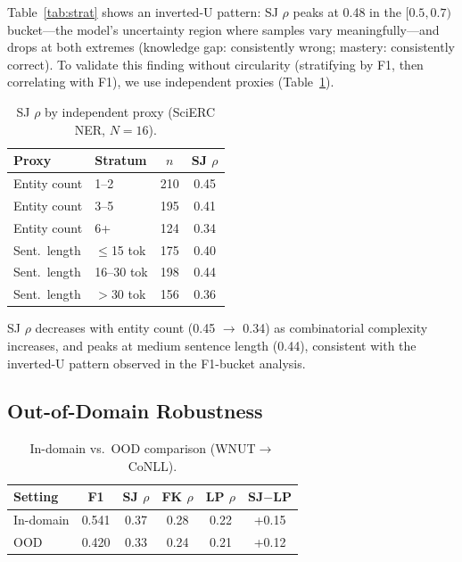 \documentclass[11pt,a4paper]{article}
\begin{document}
Table~\ref{tab:strat} shows an inverted-U pattern: SJ $\rho$ peaks at 0.48 in the $[0.5, 0.7)$ bucket---the model's uncertainty region where samples vary meaningfully---and drops at both extremes (knowledge gap: consistently wrong; mastery: consistently correct). To validate this finding without circularity (stratifying by F1, then correlating with F1), we use independent proxies (Table~\ref{tab:proxy}).

\begin{table}[t]
\centering
\small
\caption{SJ $\rho$ by independent proxy (SciERC NER, $N{=}16$).}
\label{tab:proxy}
\begin{tabular}{llcc}
\toprule
\textbf{Proxy} & \textbf{Stratum} & $n$ & \textbf{SJ $\rho$} \\
\midrule
Entity count & 1--2 & 210 & 0.45 \\
Entity count & 3--5 & 195 & 0.41 \\
Entity count & 6+ & 124 & 0.34 \\
Sent.\ length & $\leq$15 tok & 175 & 0.40 \\
Sent.\ length & 16--30 tok & 198 & 0.44 \\
Sent.\ length & $>$30 tok & 156 & 0.36 \\
\bottomrule
\end{tabular}
\end{table}

SJ $\rho$ decreases with entity count (0.45 $\to$ 0.34) as combinatorial complexity increases, and peaks at medium sentence length (0.44), consistent with the inverted-U pattern observed in the F1-bucket analysis.

\subsection{Out-of-Domain Robustness}
\label{sec:ood}

\begin{table}[t]
\centering
\small
\caption{In-domain vs.\ OOD comparison (WNUT$\to$CoNLL).}
\label{tab:ood}
\begin{tabular}{lccccc}
\toprule
\textbf{Setting} & \textbf{F1} & \textbf{SJ $\rho$} & \textbf{FK $\rho$} & \textbf{LP $\rho$} & \textbf{SJ$-$LP} \\
\midrule
In-domain & 0.541 & 0.37 & 0.28 & 0.22 & +0.15 \\
OOD & 0.420 & 0.33 & 0.24 & 0.21 & +0.12 \\
\bottomrule
\end{tabular}
\end{table}
\end{document}

